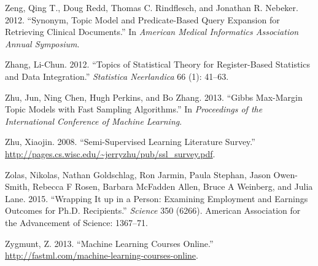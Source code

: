 \documentclass[]{krantz}
\begin{document}
\hypertarget{ref-Zeng-2012}{}
Zeng, Qing T., Doug Redd, Thomas C. Rindflesch, and Jonathan R. Nebeker.
2012. ``Synonym, Topic Model and Predicate-Based Query Expansion for
Retrieving Clinical Documents.'' In \emph{American Medical Informatics
Association Annual Symposium}.

\hypertarget{ref-Zhang2012}{}
Zhang, Li-Chun. 2012. ``Topics of Statistical Theory for Register-Based
Statistics and Data Integration.'' \emph{Statistica Neerlandica} 66 (1):
41--63.

\hypertarget{ref-zhu-13}{}
Zhu, Jun, Ning Chen, Hugh Perkins, and Bo Zhang. 2013. ``Gibbs
Max-Margin Topic Models with Fast Sampling Algorithms.'' In
\emph{Proceedings of the International Conference of Machine Learning}.

\hypertarget{ref-zhu2005semi}{}
Zhu, Xiaojin. 2008. ``Semi-Supervised Learning Literature Survey.''
\url{http://pages.cs.wisc.edu/~jerryzhu/pub/ssl_survey.pdf}.

\hypertarget{ref-zolas2015wrapping}{}
Zolas, Nikolas, Nathan Goldschlag, Ron Jarmin, Paula Stephan, Jason
Owen-Smith, Rebecca F Rosen, Barbara McFadden Allen, Bruce A Weinberg,
and Julia Lane. 2015. ``Wrapping It up in a Person: Examining Employment
and Earnings Outcomes for Ph.D. Recipients.'' \emph{Science} 350 (6266).
American Association for the Advancement of Science: 1367--71.

\hypertarget{ref-MLcourses}{}
Zygmunt, Z. 2013. ``Machine Learning Courses Online.''
\url{http://fastml.com/machine-learning-courses-online}.
\end{document}
